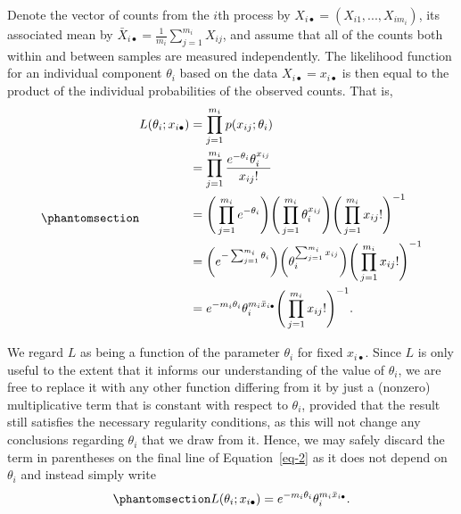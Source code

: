 \documentclass[
  12pt]{article}
\begin{document}
Denote the vector of counts from the \(i\)th process by
\(X_{i\bullet} = (X_{i1}, ..., X_{im_i})\), its associated mean by
\(\bar{X}_{i \bullet} = \frac{1}{m_i} \sum_{j = 1}^{m_i} X_{ij}\), and
assume that all of the counts both within and between samples are
measured independently. The likelihood function for an individual
component \(\theta_i\) based on the data \(X_{i\bullet} = x_{i\bullet}\)
is then equal to the product of the individual probabilities of the
observed counts. That is, \begin{equation}\phantomsection\label{eq-2}{
\begin{aligned}
L(\theta_i; x_{i\bullet}) &= \prod_{j=1}^{m_i} p(x_{ij}; \theta_i) \\
                          &= \prod_{j=1}^{m_i} \frac{e^{-\theta_i} \theta_i ^ {x_{ij}}}{x_{ij}!} \\
                          &= \Bigg(\prod_{j=1}^{m_i} e^{-\theta_i}\Bigg) \Bigg(\prod_{j=1}^{m_i}\theta_i^{x_{ij}}\Bigg) \Bigg(\prod_{j=1}^{m_i} x_{ij}!\Bigg)^{-1} \\
                          &= \bigg(e^{-\sum_{j=1}^{m_i}\theta_i}\bigg) \bigg(\theta_i^{\sum_{j=1}^{m_i}x_{ij}}\bigg) \Bigg(\prod_{j=1}^{m_i} x_{ij}!\Bigg)^{-1} \\
                          &= e^{-m_i\theta_i}\theta_i^{m_i\bar{x}_{i\bullet}}\Bigg(\prod_{j=1}^{m_i} x_{ij}!\Bigg)^{-1}.
\end{aligned}
}\end{equation}

We regard \(L\) as being a function of the parameter \(\theta_i\) for
fixed \(x_{i\bullet}\). Since \(L\) is only useful to the extent that it
informs our understanding of the value of \(\theta_i\), we are free to
replace it with any other function differing from it by just a (nonzero)
multiplicative term that is constant with respect to \(\theta_i\),
provided that the result still satisfies the necessary regularity
conditions, as this will not change any conclusions regarding
\(\theta_i\) that we draw from it. Hence, we may safely discard the term
in parentheses on the final line of Equation~\ref{eq-2} as it does not
depend on \(\theta_i\) and instead simply write
\begin{equation}\phantomsection\label{eq-3}{
L(\theta_i; x_{i\bullet}) = e^{-m_i\theta_i}\theta_i^{m_i\bar{x}_{i\bullet}}.
}\end{equation}
\end{document}
